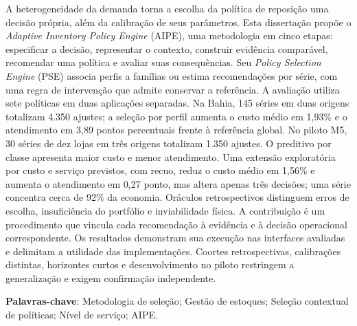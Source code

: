 A heterogeneidade da demanda torna a escolha da política de reposição uma decisão própria, além da calibração de seus parâmetros. Esta dissertação propõe o \textit{Adaptive Inventory Policy Engine} (AIPE), uma metodologia em cinco etapas: especificar a decisão, representar o contexto, construir evidência comparável, recomendar uma política e avaliar suas consequências. Seu \textit{Policy Selection Engine} (PSE) associa perfis a famílias ou estima recomendações por série, com uma regra de intervenção que admite conservar a referência. A avaliação utiliza sete políticas em duas aplicações separadas. Na Bahia, 145 séries em duas origens totalizam 4.350 ajustes; a seleção por perfil aumenta o custo médio em 1,93\% e o atendimento em 3,89 pontos percentuais frente à referência global. No piloto M5, 30 séries de dez lojas em três origens totalizam 1.350 ajustes. O preditivo por classe apresenta maior custo e menor atendimento. Uma extensão exploratória por custo e serviço previstos, com recuo, reduz o custo médio em 1,56\% e aumenta o atendimento em 0,27 ponto, mas altera apenas três decisões; uma série concentra cerca de 92\% da economia. Oráculos retrospectivos distinguem erros de escolha, insuficiência do portfólio e inviabilidade física. A contribuição é um procedimento que vincula cada recomendação à evidência e à decisão operacional correspondente. Os resultados demonstram sua execução nas interfaces avaliadas e delimitam a utilidade das implementações. Coortes retrospectivas, calibrações distintas, horizontes curtos e desenvolvimento no piloto restringem a generalização e exigem confirmação independente.

\vspace{2em}
\textbf{Palavras-chave}: Metodologia de seleção; Gestão de estoques; Seleção contextual de políticas; Nível de serviço; AIPE.
